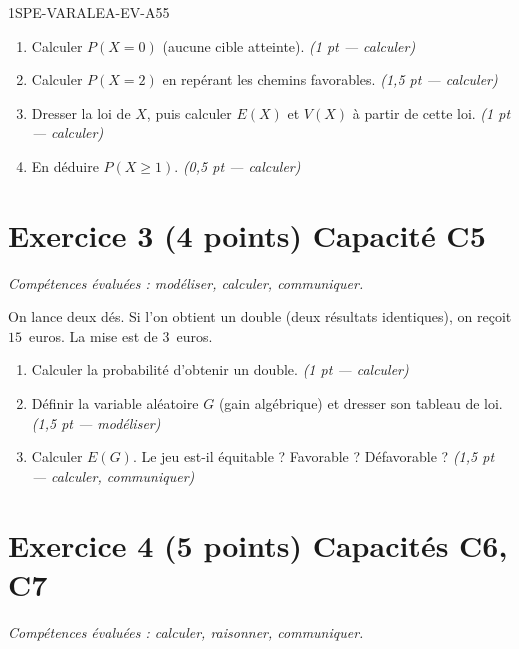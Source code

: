 \begin{evaluation}{1SPE-VARALEA-EV-A}{55}
\begin{enumerate}
  \item Calculer $P(X = 0)$ (aucune cible atteinte).
  \hfill\textit{(1 pt — calculer)}

  \item Calculer $P(X = 2)$ en repérant les chemins favorables.
  \hfill\textit{(1{,}5 pt — calculer)}

  \item Dresser la loi de $X$, puis calculer $E(X)$ et $V(X)$ à partir de cette loi.
  \hfill\textit{(1 pt — calculer)}

  \item En déduire $P(X \geq 1)$.
  \hfill\textit{(0{,}5 pt — calculer)}
\end{enumerate}

\section*{Exercice 3 \hfill (4 points) \hfill Capacité C5}

\textit{Compétences évaluées : modéliser, calculer, communiquer.}

\medskip
On lance deux dés. Si l'on obtient un double (deux résultats identiques), on reçoit $15$~euros. La mise est de $3$~euros.

\begin{enumerate}
  \item Calculer la probabilité d'obtenir un double.
  \hfill\textit{(1 pt — calculer)}

  \item Définir la variable aléatoire $G$ (gain algébrique) et dresser son tableau de loi.
  \hfill\textit{(1{,}5 pt — modéliser)}

  \item Calculer $E(G)$. Le jeu est-il équitable ? Favorable ? Défavorable ?
  \hfill\textit{(1{,}5 pt — calculer, communiquer)}
\end{enumerate}

\section*{Exercice 4 \hfill (5 points) \hfill Capacités C6, C7}

\textit{Compétences évaluées : calculer, raisonner, communiquer.}


\end{evaluation}
